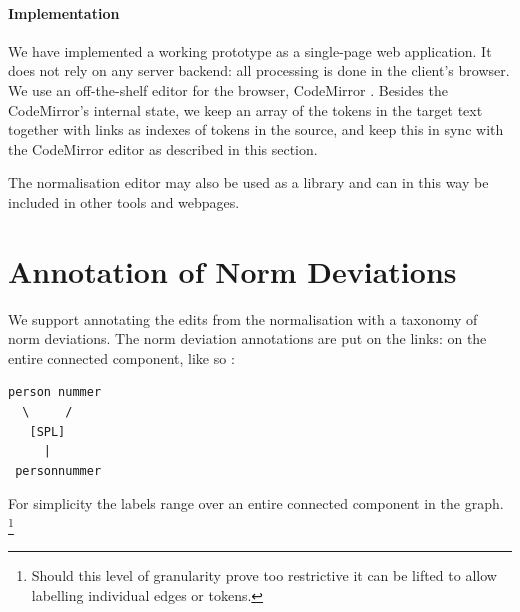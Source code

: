 \documentclass[10pt, a4paper]{article}
\newcommand{\dan}[1]{{\color{Fuchsia}{Dan: #1}}}
\begin{document}
\paragraph{Implementation}
We have implemented a working prototype as a single-page web application.
It does not rely on any server backend: all processing is done in the
client's browser. We use an off-the-shelf editor for the browser,
CodeMirror \cite{CodeMirror}.
Besides the CodeMirror's internal state, we keep an array of the tokens in the
target text together with links as indexes of tokens in the source,
and keep this in sync with the CodeMirror editor as described in this section.

The normalisation editor may also be used as a library and can in this way
be included in other tools and webpages.
\dan{Should we link to a demo version of the editor? Do LREC reviewers care
about running tools? It would be a good complement nevertheless.}
\dan{MIT License? This is what I have been supposing since it is the standard at SB}


\section{Annotation of Norm Deviations}
\label{sec:ann_tool}

We support annotating the edits from the normalisation with a taxonomy
of norm deviations.  The norm deviation annotations are put on the links:
on the entire connected component, like so \dan{in ascii art for now}:

\begin{verbatim}
person nummer
  \     /
   [SPL]
     |
 personnummer
\end{verbatim}

For simplicity the labels range over an entire connected
component in the graph.
\footnote{Should this level of granularity prove too restrictive
it can be lifted to allow labelling individual edges or tokens.}
\end{document}
